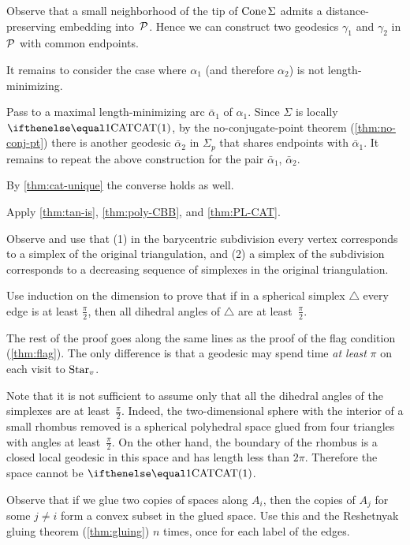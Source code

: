 Observe that a small neighborhood of the tip of $\mathop{\rm Cone}\nolimits\Sigma$ admits a distance-preserving embedding into~$\mathcal{P}$.
Hence we can construct two geodesics $\gamma_1$ and $\gamma_2$ in $\mathcal{P}$ with common endpoints.

It remains to consider the case where $\alpha_1$ (and therefore $\alpha_2$) is not length-minimizing.

Pass to a maximal length-minimizing arc $\bar\alpha_1$ of $\alpha_1$.
Since $\Sigma$ is locally $\CAT1$, by the no-conjugate-point theorem (\ref{thm:no-conj-pt}) 
there is another geodesic $\bar\alpha_2$ in $\Sigma_p$ that shares endpoints with $\bar\alpha_1$.
It remains to repeat the above construction for the pair $\bar\alpha_1$, $\bar\alpha_2$.

By \ref{thm:cat-unique} the converse holds as well.

 Apply \ref{thm:tan-is}, \ref{thm:poly-CBB}, and \ref{thm:PL-CAT}.

Observe and use that (1) in the barycentric subdivision every vertex corresponds to a simplex of the original triangulation,
and (2) a simplex of the subdivision corresponds to a decreasing sequence of simplexes in the original triangulation. 

Use induction on the dimension  to prove that if in a spherical simplex $\triangle$ every edge is at least $\tfrac\pi2$, then 
all dihedral angles of $\triangle$ are at least~$\tfrac\pi2$.

The rest of the proof goes along the same lines as the proof of the flag condition (\ref{thm:flag}).
The only difference is that a geodesic may spend time {}\emph{at least} $\pi$ on each visit to $\mathop{\rm Star}\nolimits_v$.

Note that it is not sufficient to assume only that all the dihedral angles of the simplexes are at least~$\tfrac\pi2$. 
Indeed, the two-dimensional sphere with the interior of a small rhombus removed is a spherical polyhedral space glued from four triangles with angles at least~$\tfrac\pi2$.
On the other hand, the boundary of the rhombus is a closed local geodesic in this space and has length less than $2\pi$.
Therefore the space cannot be $\CAT1$.

Observe that if we glue two copies of spaces along $A_i$, then the copies of $A_j$ for some $j\ne i$ form a convex subset in the glued space.
Use this and the Reshetnyak gluing theorem (\ref{thm:gluing}) $n$ times, once for each label of the edges.

